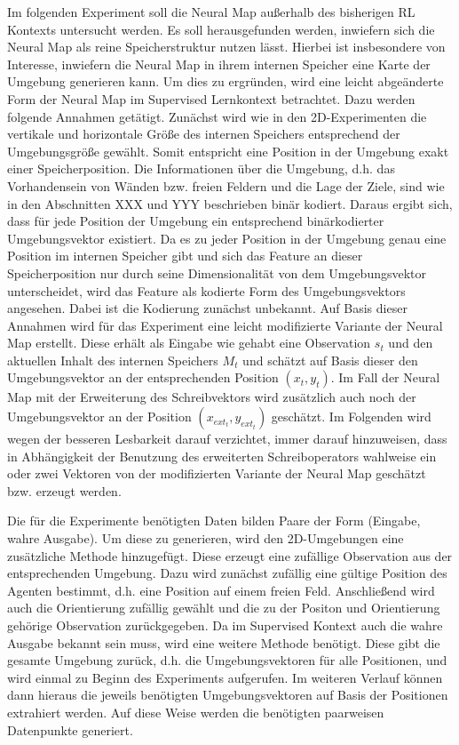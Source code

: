 Im folgenden Experiment soll die Neural Map außerhalb des bisherigen RL Kontexts untersucht werden. Es soll herausgefunden werden, inwiefern sich die Neural Map als reine Speicherstruktur nutzen lässt. Hierbei ist insbesondere von Interesse, inwiefern die Neural Map in ihrem internen Speicher eine Karte der Umgebung generieren kann. Um dies zu ergründen, wird eine leicht abgeänderte Form der Neural Map im Supervised Lernkontext betrachtet. Dazu werden folgende Annahmen getätigt. Zunächst wird wie in den 2D-Experimenten die vertikale und horizontale Größe des internen Speichers entsprechend der Umgebungsgröße gewählt. Somit entspricht eine Position in der Umgebung exakt einer Speicherposition. Die Informationen über die Umgebung, d.h. das Vorhandensein von Wänden bzw. freien Feldern und die Lage der Ziele, sind wie in den Abschnitten XXX und YYY beschrieben binär kodiert. Daraus ergibt sich, dass für jede Position der Umgebung ein entsprechend binärkodierter Umgebungsvektor existiert. Da es zu jeder Position in der Umgebung genau eine Position im internen Speicher gibt und sich das Feature an dieser Speicherposition nur durch seine Dimensionalität von dem Umgebungsvektor unterscheidet, wird das Feature als kodierte Form des Umgebungsvektors angesehen. Dabei ist die Kodierung zunächst unbekannt. Auf Basis dieser Annahmen wird für das Experiment eine leicht modifizierte Variante der Neural Map erstellt. Diese erhält als Eingabe wie gehabt eine Observation $s_t$ und den aktuellen Inhalt des internen Speichers $M_t$ und schätzt auf Basis dieser den Umgebungsvektor an der entsprechenden Position $(x_t, y_t)$. Im Fall der Neural Map mit der Erweiterung des Schreibvektors wird zusätzlich auch noch der Umgebungsvektor an der Position $(x_{ext_t},y_{ext_t})$ geschätzt. Im Folgenden wird wegen der besseren Lesbarkeit darauf verzichtet, immer darauf hinzuweisen, dass in Abhängigkeit der Benutzung des erweiterten Schreiboperators wahlweise ein oder zwei Vektoren von der modifizierten Variante der Neural Map geschätzt bzw. erzeugt werden.

Die für die Experimente benötigten Daten bilden Paare der Form (Eingabe, wahre Ausgabe). Um diese zu generieren, wird den 2D-Umgebungen eine zusätzliche Methode hinzugefügt. Diese erzeugt eine zufällige Observation aus der entsprechenden Umgebung. Dazu wird zunächst zufällig eine gültige Position des Agenten bestimmt, d.h. eine Position auf einem freien Feld. Anschließend wird auch die Orientierung zufällig gewählt und die zu der Positon und Orientierung gehörige Observation zurückgegeben. Da im Supervised Kontext auch die wahre Ausgabe bekannt sein muss, wird eine weitere Methode benötigt. Diese gibt die gesamte Umgebung zurück, d.h. die Umgebungsvektoren für alle Positionen, und wird einmal zu Beginn des Experiments aufgerufen. Im weiteren Verlauf können dann hieraus die jeweils benötigten Umgebungsvektoren auf Basis der Positionen extrahiert werden. Auf diese Weise werden die benötigten paarweisen Datenpunkte generiert.

